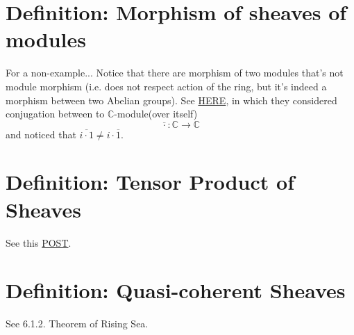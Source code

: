 \section{Definition: Morphism of sheaves of modules}

For a non-example... Notice that there are morphism of two modules that's not module morphism (i.e. does not respect action of the ring, but it's indeed a morphism between two Abelian groups). See \href{https://math.stackexchange.com/questions/1856824/is-a-group-homomorphism-a-module-homomorphism}{HERE}, in which they considered conjugation between to $\mathbb C$-module(over itself)
\[\overline{\cdot}:\mathbb C\to\mathbb C\]
and noticed that $\overline{i\cdot 1}\neq i\cdot \overline{1}$.

\section{Definition: Tensor Product of Sheaves}

See this \href{https://math.stackexchange.com/questions/1488296/tensor-product-of-sheaves-is-not-a-sheaf}{POST}.

\begin{comment}
\subsection{A Counterexample by ChatGPT}

Let \( X = \mathbb{R} \) be the real line, and consider the following covering:
\[ U_1 = (-\infty, 1) \quad \text{and} \quad U_2 = (-1, \infty) \]

We define two sheaves:
\begin{itemize}
    \item $\mathcal{F}$ is the sheaf of continuous real-valued functions on $X$.
    \item $\mathcal{G}$ is the sheaf of bounded real-valued functions on $X$.
\end{itemize}
Now, let's define the presheaf $\mathcal{H}$ on $X$ as the tensor product presheaf $\mathcal{F} \otimes \mathcal{G}$, where:


Consider the continuous, bounded functions \( f_1(x) = e^x \) defined on \( U_1 \) and \( f_2(x) = e^{-x} \) defined on \( U_2 \). These functions agree on the intersection \( U_1 \cap U_2 = \emptyset \).

However, if we attempt to glue these functions together to form a candidate section \( s \) over \( X \), we encounter a problem. Since \( f_1(x) \) and \( f_2(x) \) have different behaviors on the intervals \( U_1 \) and \( U_2 \), respectively, there is no continuous, bounded function that can extend both \( f_1(x) \) and \( f_2(x) \) over the entire real line \( X \).
\end{comment}


\section{Definition: Quasi-coherent Sheaves}

See 6.1.2. Theorem of Rising Sea. 